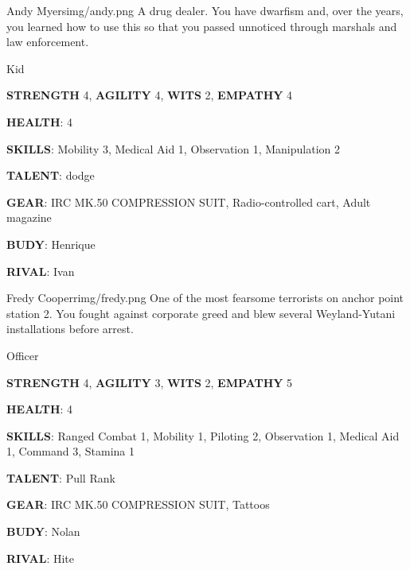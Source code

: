 
\begin{rpg-pcbox}{Andy Myers}{img/andy.png}
    A drug dealer. You have dwarfism and, over the years, you learned how to use this so that you passed unnoticed through marshals and law enforcement. 
\end{rpg-pcbox}

\begin{rpg-commentbox}{}
    Kid

    \textbf{STRENGTH} 4, \textbf{AGILITY} 4, \textbf{WITS} 2, \textbf{EMPATHY} 4

    \textbf{HEALTH}: 4

    \textbf{SKILLS}: Mobility 3, Medical Aid 1, Observation 1, Manipulation 2
    
    \textbf{TALENT}: dodge
    
    \textbf{GEAR}: IRC MK.50 COMPRESSION SUIT, Radio-controlled cart, Adult magazine

    \textbf{BUDY}: Henrique
    
    \textbf{RIVAL}: Ivan
\end{rpg-commentbox}

\newsect

\medskip \medskip \medskip \medskip \medskip \medskip \medskip \medskip \medskip \medskip \medskip \medskip \medskip \medskip \medskip \medskip \medskip \medskip

\begin{rpg-pcbox}{Fredy Cooperr}{img/fredy.png}
    One of the most fearsome terrorists on anchor point station 2. You fought against corporate greed and blew several Weyland-Yutani installations before arrest. 
\end{rpg-pcbox}

\begin{rpg-commentbox}{}
    Officer

    \textbf{STRENGTH} 4, \textbf{AGILITY} 3, \textbf{WITS} 2, \textbf{EMPATHY} 5

    \textbf{HEALTH}: 4

    \textbf{SKILLS}: Ranged Combat 1, Mobility 1, Piloting 2, Observation 1, Medical Aid 1, Command 3, Stamina 1
    
    \textbf{TALENT}: Pull Rank
    
    \textbf{GEAR}: IRC MK.50 COMPRESSION SUIT, Tattoos

    \textbf{BUDY}: Nolan
    
    \textbf{RIVAL}: Hite
\end{rpg-commentbox}

\newsect

